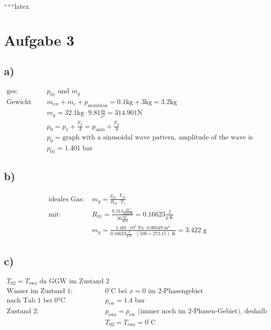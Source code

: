 
``````latex


\section*{Aufgabe 3}

\subsection*{a)}
\begin{align*}
    \text{ges: } & p_{01} \text{ und } m_g \\
    \text{Gewicht auf Gas lastend: } & m_{ew} + m_c + p_{\text{membran}} = 0.1 \text{kg} + 3 \text{kg} = 3.2 \text{kg} \\
    & m_g = 32.1 \text{kg} \cdot 9.81 \frac{\text{m}}{\text{s}^2} = 314.901 \text{N} \\
    & p_0 = p_1 + \frac{F_g}{A} = p_{\text{amb}} + \frac{F_g}{A} \\
    & p_0 = \text{graph with a sinusoidal wave pattern, amplitude of the wave is approximately 0.05 m, and the wave is centered around 314.901 N. The x-axis is labeled in meters (m) and the y-axis in Newtons (N).} \\
    & p_{01} = 1.401 \text{ bar}
\end{align*}

\subsection*{b)}
\begin{align*}
    \text{ideales Gas: } & m_g = \frac{p_{01} \cdot V_m}{R_{01} \cdot T_1} \\
    \text{mit: } & R_{01} = \frac{8.314 \frac{\text{m}^3}{\text{mol} \cdot \text{K}}}{50 \frac{\text{m}^2}{\text{mol}}} = 0.16623 \frac{\text{J}}{\text{g} \cdot \text{K}} \\
    & m_g = \frac{1.401 \cdot 10^5 \text{ Pa} \cdot 0.00349 \text{ m}^3}{0.16623 \frac{\text{J}}{\text{g} \cdot \text{K}} \cdot (500 + 273.15) \text{ K}} = 3.422 \text{ g}
\end{align*}

\subsection*{c)}
\begin{align*}
    T_{02} = T_{\text{ewz}} \text{ da GGW im Zustand 2} \\
    \text{Wasser im Zustand 1: } & 0^\circ \text{C bei } x = 0 \text{ im 2-Phasengebiet} \\
    \text{nach Tab 1 bei 0°C } & p_{\text{ew}} = 1.4 \text{ bar} \\
    \text{Zustand 2: } & p_{\text{ewz}} = p_{\text{ew}} \text{ (immer noch im 2-Phasen-Gebiet), deshalb} \\
    & T_{02} = T_{\text{ewz}} = 0^\circ \text{C}
\end{align*}

